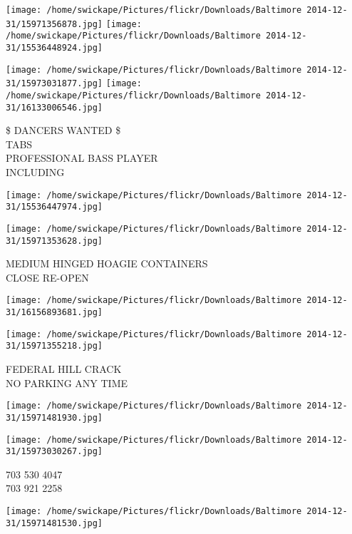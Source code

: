 \documentclass[10pt,letterpaper]{article}
\begin{document}
\texttt{[image: /home/swickape/Pictures/flickr/Downloads/Baltimore 2014-12-31/15971356878.jpg]}
\texttt{[image: /home/swickape/Pictures/flickr/Downloads/Baltimore 2014-12-31/15536448924.jpg]}

\texttt{[image: /home/swickape/Pictures/flickr/Downloads/Baltimore 2014-12-31/15973031877.jpg]}
\texttt{[image: /home/swickape/Pictures/flickr/Downloads/Baltimore 2014-12-31/16133006546.jpg]}

\$ DANCERS WANTED \$\\
TABS\\
PROFESSIONAL BASS PLAYER\\
INCLUDING\\
\pagebreak

\texttt{[image: /home/swickape/Pictures/flickr/Downloads/Baltimore 2014-12-31/15536447974.jpg]}

\vspace{0.25in}
\texttt{[image: /home/swickape/Pictures/flickr/Downloads/Baltimore 2014-12-31/15971353628.jpg]}

MEDIUM HINGED HOAGIE CONTAINERS\\
CLOSE RE{-}OPEN\\
\pagebreak

\texttt{[image: /home/swickape/Pictures/flickr/Downloads/Baltimore 2014-12-31/16156893681.jpg]}

\vspace{0.25in}
\texttt{[image: /home/swickape/Pictures/flickr/Downloads/Baltimore 2014-12-31/15971355218.jpg]}

FEDERAL HILL CRACK\\
NO PARKING ANY TIME\\
\pagebreak

\texttt{[image: /home/swickape/Pictures/flickr/Downloads/Baltimore 2014-12-31/15971481930.jpg]}

\vspace{0.25in}
\texttt{[image: /home/swickape/Pictures/flickr/Downloads/Baltimore 2014-12-31/15973030267.jpg]}

703 530 4047\\
703 921 2258\\
\pagebreak

\texttt{[image: /home/swickape/Pictures/flickr/Downloads/Baltimore 2014-12-31/15971481530.jpg]}
\end{document}
